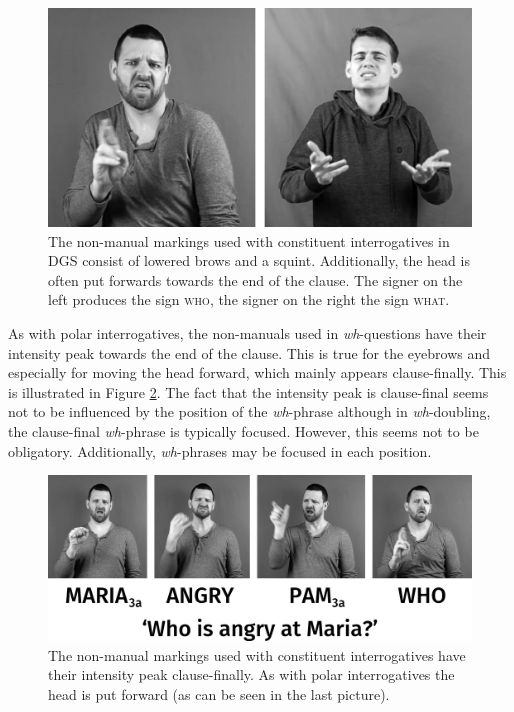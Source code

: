 \begin{figure}[bt]
\centering
	\includegraphics[width=1.0\textwidth]{nnmwhatwhosw.jpg}
	\caption{The non-manual markings used with constituent interrogatives in DGS consist of lowered brows and a squint. Additionally, the head is often put forwards towards the end of the clause. The signer on the left produces the sign \textsc{who}, the signer on the right the sign \textsc{what}.}
	\label{nnmwhatwho}
\end{figure}

As with polar interrogatives, the non-manuals used in \textit{wh}-questions have their intensity peak towards the end of the clause. This is true for the eyebrows and especially for moving the head forward, which mainly appears clause-finally. This is illustrated in Figure \ref{nnmwhatwhotwo}. The fact that the intensity peak is clause-final seems not to be influenced by the position of the \textit{wh}-phrase although in \textit{wh}-doubling, the clause-final \textit{wh}-phrase is typically focused. However, this seems not to be obligatory. Additionally, \textit{wh}-phrases may be focused in each position. 


\begin{figure}[bt]
\centering
	\includegraphics[width=1.0\textwidth]{whnonmanualsexamplesw.jpg}
	\caption{The non-manual markings used with constituent interrogatives have their intensity peak clause-finally. As with polar interrogatives the head is put forward (as can be seen in the last picture).}
	\label{nnmwhatwhotwo}
\end{figure}

